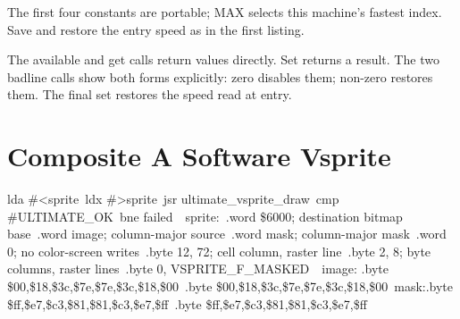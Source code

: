 \begin{resultbox}
The first four constants are portable; MAX selects this machine's fastest
index. Save and restore the entry speed as in the first listing.
\end{resultbox}

The available and get calls return values directly. Set returns a result. The
two badline calls show both forms explicitly: zero disables them; non-zero
restores them. The final set restores the speed read at entry.


\section{Composite A Software Vsprite}

\begin{listingbox}
\hspace*{2em}lda \#<sprite\
\hspace*{2em}ldx \#>sprite\
\hspace*{2em}jsr ultimate\_vsprite\_draw\
\hspace*{2em}cmp \#ULTIMATE\_OK\
\hspace*{2em}bne failed\
\
sprite:\
\hspace*{2em}.word \$6000\hspace{2em}; destination bitmap base\
\hspace*{2em}.word image\hspace{3em}; column-major source\
\hspace*{2em}.word mask\hspace{4em}; column-major mask\
\hspace*{2em}.word 0\hspace{5em}; no color-screen writes\
\hspace*{2em}.byte 12, 72\hspace{2em}; cell column, raster line\
\hspace*{2em}.byte 2, 8\hspace{3em}; byte columns, raster lines\
\hspace*{2em}.byte 0, VSPRITE\_F\_MASKED\
\
image: .byte \$00,\$18,\$3c,\$7e,\$7e,\$3c,\$18,\$00\
\hspace*{3.5em}.byte \$00,\$18,\$3c,\$7e,\$7e,\$3c,\$18,\$00\
mask:\hspace*{0.4em}.byte \$ff,\$e7,\$c3,\$81,\$81,\$c3,\$e7,\$ff\
\hspace*{3.5em}.byte \$ff,\$e7,\$c3,\$81,\$81,\$c3,\$e7,\$ff
\end{listingbox}

